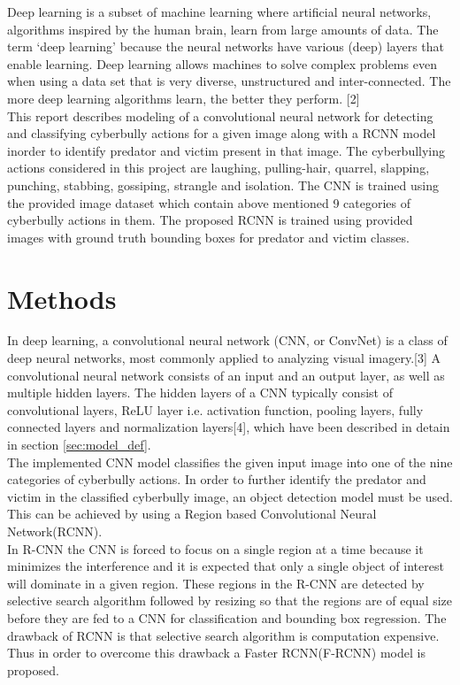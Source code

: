 \documentclass[12pt]{article}
\begin{document}
Deep learning is a subset of machine learning where artificial neural networks, algorithms inspired by the human brain, learn from large amounts of data. The term  ‘deep learning’ because the neural networks have various (deep) layers that enable learning. Deep learning allows machines to solve complex problems even when using a data set that is very diverse, unstructured and inter-connected. The more deep learning algorithms learn, the better they perform. [2] \\

This report describes modeling of a convolutional neural network for detecting and classifying cyberbully actions for a given image along with a RCNN model inorder to identify predator and victim present in that image. The cyberbullying actions considered in this project are laughing, pulling-hair, quarrel, slapping, punching, stabbing, gossiping, strangle and isolation. The CNN is trained using the provided image dataset which contain above mentioned 9 categories of cyberbully actions in them. The proposed RCNN is trained using provided images with ground truth bounding boxes for predator and victim classes.    

\newpage

\section{Methods}
In deep learning, a convolutional neural network (CNN, or ConvNet) is a class of deep neural networks, most commonly applied to analyzing visual imagery.[3] A convolutional neural network consists of an input and an output layer, as well as multiple hidden layers. The hidden layers of a CNN typically consist of convolutional layers, ReLU layer i.e. activation function, pooling layers, fully connected layers and normalization layers[4], which have been described in detain in section \ref{sec:model_def}. \\ 

The implemented CNN model classifies the given input image into one of the nine categories of cyberbully actions. In order to further identify the predator and victim in the classified cyberbully image, an object detection model must be used. This can be achieved by using a Region based Convolutional Neural Network(RCNN). \\

In R-CNN the CNN is forced to focus on a single region at a time because it minimizes the interference and it is expected that only a single object of interest will dominate in a given region. These regions in the R-CNN are detected by selective search algorithm followed by resizing so that the regions are of equal size before they are fed to a CNN for classification and bounding box regression. The drawback of RCNN is that selective search algorithm is computation expensive. Thus in order to overcome this drawback a Faster RCNN(F-RCNN) model is proposed. \\
\end{document}
